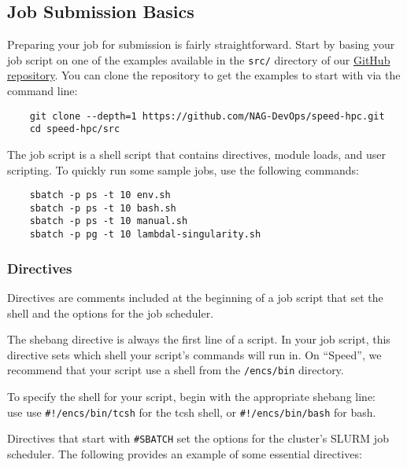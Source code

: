 \subsection{Job Submission Basics}
\label{sect:job-submission-basics}

Preparing your job for submission is fairly straightforward.
Start by basing your job script on one of the examples available in the \texttt{src/}
directory of our \href{https://github.com/NAG-DevOps/speed-hpc}{GitHub repository}.
You can clone the repository to get the examples to start with via the command line:

\begin{verbatim}
    git clone --depth=1 https://github.com/NAG-DevOps/speed-hpc.git
    cd speed-hpc/src
\end{verbatim}

\noindent The job script is a shell script that contains directives, module loads, and user scripting.
To quickly run some sample jobs, use the following commands:
\begin{verbatim}
    sbatch -p ps -t 10 env.sh
    sbatch -p ps -t 10 bash.sh
    sbatch -p ps -t 10 manual.sh
    sbatch -p pg -t 10 lambdal-singularity.sh
\end{verbatim}

\subsubsection{Directives}
\label{sect:directives}


Directives are comments included at the beginning of a job script that set the shell
and the options for the job scheduler.

The shebang directive is always the first line of a script. 
In your job script, this directive sets which shell your script's commands will run in. 
On ``Speed'', we recommend that your script use a shell from the \texttt{/encs/bin} directory.

To specify the shell for your script, begin with the appropriate shebang line:\\
use use \verb|#!/encs/bin/tcsh| for the tcsh shell, or \verb|#!/encs/bin/bash| for bash.

Directives that start with \verb|#SBATCH| set the options for the cluster's SLURM job scheduler.
The following provides an example of some essential directives:

